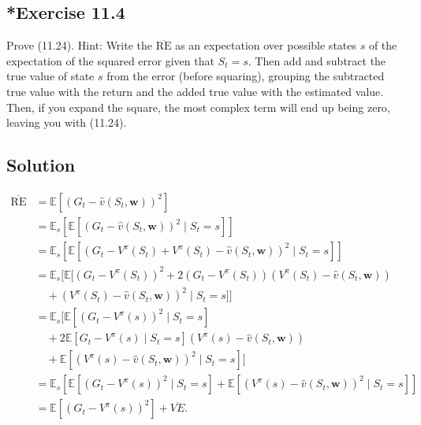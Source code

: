 \subsection*{*Exercise 11.4}

Prove (11.24). Hint: Write the $\overline{\text{RE}}$ as an expectation over possible states
$s$ of the expectation of the squared error given that $S_t = s$. Then add and subtract the
true value of state $s$ from the error (before squaring), grouping the subtracted true value
with the return and the added true value with the estimated value. Then, if you expand
the square, the most complex term will end up being zero, leaving you with (11.24).

\subsection*{Solution}

\begin{align*}
    \overline{\text{RE}} &= \mathbb{E} \left[ \left( G_t - \hat{v}(S_t,\mathbf{w}) \right)^2 \right] \\
    &= \mathbb{E}_s \left[ \mathbb{E} \left[ \left(G_t -  \hat{v}(S_t,\mathbf{w}) \right)^2 \mid S_t = s \right] \right] \\
    &= \mathbb{E}_s \left[ \mathbb{E} \left[ \left(G_t - V^\pi(S_t) + V^\pi(S_t) - \hat{v}(S_t,\mathbf{w}) \right)^2 \mid S_t = s \right] \right] \\
    &= \mathbb{E}_s \Big[ \mathbb{E} \Big[ \left(G_t - V^\pi(S_t) \right)^2 
    + 2 \left(G_t - V^\pi(S_t) \right) \left(V^\pi(S_t) - \hat{v}(S_t,\mathbf{w}) \right)  \\
    &\quad + \left(V^\pi(S_t) - \hat{v}(S_t,\mathbf{w}) \right)^2 \mid S_t = s \Big] \Big] \\
    &= \mathbb{E}_s \Big[\mathbb{E} \left[ \left(G_t - V^\pi(s)\right)^2 \mid S_t = s \right] \\
    &\quad + 2 \mathbb{E} \left[ G_t - V^\pi(s) \mid S_t = s \right] (V^\pi(s) - \hat{v}(S_t,\mathbf{w})) \\
    &\quad + \mathbb{E}\left[ (V^\pi(s) - \hat{v}(S_t,\mathbf{w}))^2 \mid S_t = s \right] \Big] \\
    &= \mathbb{E}_s \left[\mathbb{E} \left[ \left(G_t - V^\pi(s)\right)^2 \mid S_t = s \right] + \mathbb{E}\left[ \left(V^\pi(s) - \hat{v}(S_t,\mathbf{w})\right)^2 \mid S_t = s \right] \right] \\
    &= \mathbb{E} \left[ \left(G_t - V^\pi(s)\right)^2 \right] +  \overline{VE}.
\end{align*}

